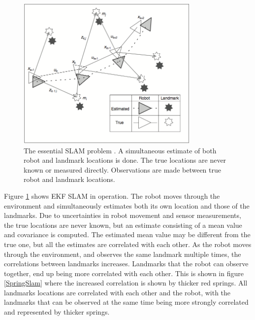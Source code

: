 \documentclass[conference]{IEEEtran}
\begin{document}
\begin{figure}[!t]
\centering
\includegraphics[width=3.5in]{./figures/EssSlam.png}
\caption{The essential SLAM problem \cite{slam1}. A simultaneous estimate of both robot and landmark locations is done. The true locations are never known or measured directly. Observations are made between true robot and landmark locations.}
\label{EssSlam}
\end{figure}

Figure \ref{EssSlam} shows EKF SLAM in operation. The robot moves through the environment and simultaneously estimates both its own location and those of the landmarks. Due to uncertainties in robot movement and sensor measurements, the true locations are never known, but an estimate consisting of a mean value and covariance is computed. The estimated mean value may be different from the true one, but all the estimates are correlated with each other. As the robot moves through the environment, and observes the same landmark multiple times, the correlations between landmarks increases. Landmarks that the robot can observe together, end up being more correlated with each other. This is shown in figure \ref{SpringSlam} where the increased correlation is shown by thicker red springs. All landmarks locations are correlated with each other and the robot, with the landmarks that can be observed at the same time being more strongly correlated and represented by thicker springs.
\end{document}
